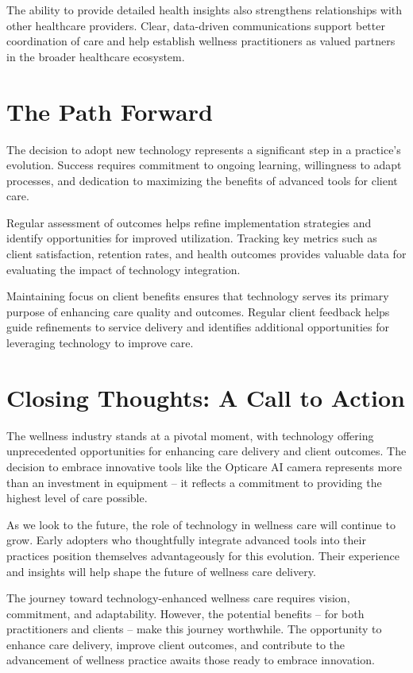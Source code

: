 \documentclass[
  Letterpaper,
]{scrbook}
\begin{document}
The ability to provide detailed health insights also strengthens
relationships with other healthcare providers. Clear, data-driven
communications support better coordination of care and help establish
wellness practitioners as valued partners in the broader healthcare
ecosystem.

\section{The Path Forward}\label{the-path-forward}

The decision to adopt new technology represents a significant step in a
practice's evolution. Success requires commitment to ongoing learning,
willingness to adapt processes, and dedication to maximizing the
benefits of advanced tools for client care.

Regular assessment of outcomes helps refine implementation strategies
and identify opportunities for improved utilization. Tracking key
metrics such as client satisfaction, retention rates, and health
outcomes provides valuable data for evaluating the impact of technology
integration.

Maintaining focus on client benefits ensures that technology serves its
primary purpose of enhancing care quality and outcomes. Regular client
feedback helps guide refinements to service delivery and identifies
additional opportunities for leveraging technology to improve care.

\section{Closing Thoughts: A Call to
Action}\label{closing-thoughts-a-call-to-action}

The wellness industry stands at a pivotal moment, with technology
offering unprecedented opportunities for enhancing care delivery and
client outcomes. The decision to embrace innovative tools like the
Opticare AI camera represents more than an investment in equipment -- it
reflects a commitment to providing the highest level of care possible.

As we look to the future, the role of technology in wellness care will
continue to grow. Early adopters who thoughtfully integrate advanced
tools into their practices position themselves advantageously for this
evolution. Their experience and insights will help shape the future of
wellness care delivery.

The journey toward technology-enhanced wellness care requires vision,
commitment, and adaptability. However, the potential benefits -- for
both practitioners and clients -- make this journey worthwhile. The
opportunity to enhance care delivery, improve client outcomes, and
contribute to the advancement of wellness practice awaits those ready to
embrace innovation.
\end{document}
